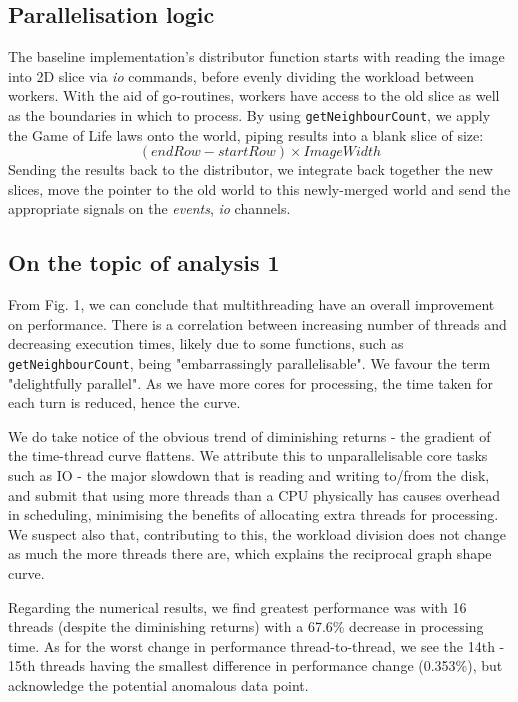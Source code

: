 \documentclass[twoside,twocolumn]{article}
\begin{document}
\subsection{Parallelisation logic}
The baseline implementation's distributor function starts with
reading the image into 2D slice via \textit{io} commands, before evenly dividing 
the workload between workers. With the aid of go-routines, workers have access to the old slice
as well as the boundaries in which to process. By using \texttt{getNeighbourCount}, we apply the Game of Life
laws onto the world, piping results into a blank slice of size: \[( endRow - startRow ) \times ImageWidth\]
Sending the results back to the distributor, we integrate back together the new slices, move the pointer to the old world
to this newly-merged world and send the appropriate signals on the \textit{events}, \textit{io} channels.


\subsection{On the topic of analysis 1}

From Fig. 1, we can conclude that multithreading have an overall improvement on performance. 
There is a correlation between increasing number of threads and decreasing execution times, likely due 
to some functions, such as \texttt{getNeighbourCount}, being "embarrassingly parallelisable". We 
favour the term "delightfully parallel". As we have more cores for processing, the time taken for each turn is 
reduced, hence the curve. 

We do take notice of the obvious trend of diminishing returns - 
the gradient of the time-thread curve flattens. We attribute this to unparallelisable core tasks such as IO 
- the major slowdown that is reading and writing to/from the disk, and submit that using more threads than 
a CPU physically has causes overhead in scheduling, minimising the benefits of allocating extra threads for processing.
We suspect also that, contributing to this, the workload division does not change as much the more threads there are,
which explains the reciprocal graph shape curve.

Regarding the numerical results, we find greatest performance was with 16 threads (despite the diminishing returns)
with a 67.6\% decrease in processing time. As for the worst change in performance thread-to-thread, 
we see the 14th - 15th threads having the smallest difference in performance change (0.353\%), but acknowledge the
potential anomalous data point.
\end{document}
